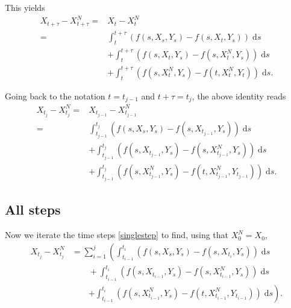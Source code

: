 \documentclass[reqno,12pt]{amsart}
\theoremstyle{plain}%
\theoremstyle{definition}
\begin{document}
This yields
\begin{align*}
    X_{t + \tau} - X_{t + \tau}^N  = & X_t - X_t^N \\
    = &  \int_t^{t + \tau} \left( f(s, X_s, Y_s) - f(s, X_t, Y_s) \right)\;\mathrm{d}s \\ 
    & + \int_t^{t + \tau} \left( f(s, X_t, Y_s) - f(s, X_t^N, Y_s) \right)\;\mathrm{d}s \\
    & + \int_t^{t + \tau} \left( f(s, X_t^N, Y_s) - f(t, X_t^N, Y_t) \right)\;\mathrm{d}s.
\end{align*}

Going back to the notation $t = t_{j-1}$ and $t + \tau = t_j$, the above identity reads
\begin{equation}
    \label{singlestep}
    \begin{aligned}
        X_{t_j} - X_{t_j}^N  = & X_{t_{j-1}} - X_{t_{j-1}}^N \\
        = &  \int_{t_{j-1}}^{t_j} \left( f(s, X_s, Y_s) - f(s, X_{t_{j-1}}, Y_s) \right)\;\mathrm{d}s \\ 
        & + \int_{t_{j-1}}^{t_j} \left( f(s, X_{t_{j-1}}, Y_s) - f(s, X_{t_{j-1}}^N, Y_s) \right)\;\mathrm{d}s \\
        & + \int_{t_{j-1}}^{t_j} \left( f(s, X_{t_{j-1}}^N, Y_s) - f(t, X_{t_{j-1}}^N, Y_{t_{j-1}}) \right)\;\mathrm{d}s.
    \end{aligned}
\end{equation}

\subsection{All steps}

Now we iterate the time steps \eqref{singlestep} to find, using that $X_0^N = X_0$,
\begin{align*}
    X_{t_j} - X_{t_j}^N & = \sum_{i=1}^{j} \left(\int_{t_{i-1}}^{t_i} \left( f(s, X_s, Y_s) - f(s, X_{t_{i}}, Y_s) \right)\;\mathrm{d}s \right. \\ 
    & \qquad + \int_{t_{i-1}}^{t_i} \left( f(s, X_{t_{i-1}}, Y_s) - f(s, X_{t_{i-1}}^N, Y_s) \right)\;\mathrm{d}s \\
    & \qquad \left. + \int_{t_{i-1}}^{t_i} \left( f(s, X_{t_{i-1}}^N, Y_s) - f(t, X_{t_{i-1}}^N, Y_{t_{i-1}}) \right)\;\mathrm{d}s \right).
\end{align*}
\end{document}
